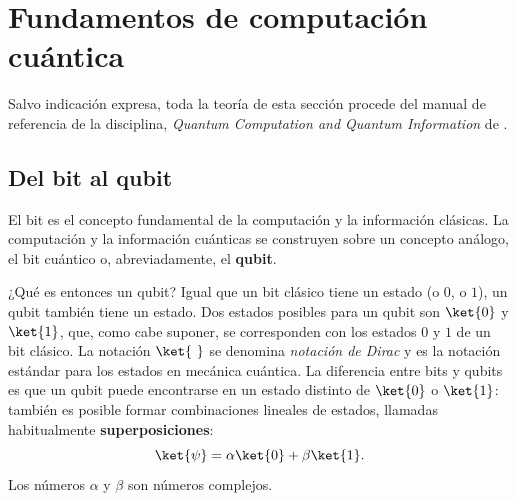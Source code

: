 

\section{Fundamentos de computación cuántica}
\label{sec:fund_cuantica}

Salvo indicación expresa, toda la teoría de esta sección procede del manual de referencia de
la disciplina, \emph{Quantum Computation and Quantum Information} de
.

\subsection{Del bit al qubit}
\label{sec:bit_qubit}
%
El bit es el concepto fundamental de la computación y la información clásicas. La
computación y la información cuánticas se construyen sobre un concepto análogo, el bit
cuántico o, abreviadamente, el \textbf{qubit}.

¿Qué es entonces un qubit? Igual que un bit clásico tiene un estado (o $0$, o $1$), un qubit
también tiene un estado. Dos estados posibles para un qubit son $\ket{0}$ y $\ket{1}$, que,
como cabe suponer, se corresponden con los estados $0$ y $1$ de un bit clásico. La notación
$\ket{\ }$ se denomina \textit{notación de Dirac} y es la
notación estándar para los estados en mecánica cuántica. La diferencia entre bits y qubits
es que un qubit puede encontrarse en un estado distinto de $\ket{0}$ o $\ket{1}$: también es
posible formar combinaciones lineales de estados, llamadas habitualmente
\textbf{superposiciones}:
\begin{equation}
\label{eq:superposicion}
\ket{\psi} = \alpha \ket{0} + \beta \ket{1}.
\end{equation}
Los números $\alpha$ y $\beta$ son números complejos.

